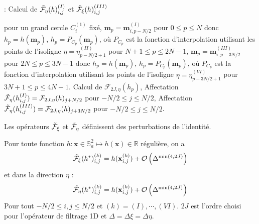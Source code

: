 \begin{center}
\begin{minipage}[H]{12cm}
  \begin{algorithm}[H]
    \caption{: Calcul de $\tilde{\mathcal{F}}_{\eta}(h)_{i,j}^{(I)}$ et $\tilde{\mathcal{F}}_{\xi}(h)_{i,j}^{(III)}$}\label{alg:ftreta}
    \begin{algorithmic}[1]
    \State pour un grand cercle $C_i^{(1)}$ fixé,
             \State  $\mathbf{m}_p = \mathbf{m}_{i,p-N/2}^{(I)}$ pour $0  \leq p \leq N$ donc $h_p = h(\mathbf{m}_p)$,
             \State $h_p = P_{C_p}(\mathbf{m}_p)$, où $P_{C_p}$ est la fonction d'interpolation utilisant les points de l'isoligne $\eta = \eta^{(II)}_{p-N/2+1}$ pour $N+1 \leq p \leq 2N-1$,
             \State  $\mathbf{m}_p = \mathbf{m}_{i,p-3N/2}^{(III)}$ pour $2N  \leq p \leq 3N-1$ donc $h_p = h(\mathbf{m}_p)$,
             \State $h_p = P_{C_p}(\mathbf{m}_p)$, où $P_{C_p}$ est la fonction d'interpolation utilisant les points de l'isoligne $\eta = \eta^{(VI)}_{p-3N/2+1}$ pour $3N+1 \leq p \leq 4N-1$.
            \EndFor
    \State Calcul de $\mathcal{F}_{2J,\eta}(h_p)$,
    \State Affectation $\tilde{\mathcal{F}}_{\eta}(h_{i,j}^{(I)}) = \mathcal{F}_{2J,\eta}(h)_{j+N/2}$ pour $-N/2 \leq j \leq N/2$,
    \State Affectation $\tilde{\mathcal{F}}_{\eta}(h_{i,j}^{(III)}) = \mathcal{F}_{2J,\eta}(h)_{j+3N/2}$ pour $-N/2 \leq j \leq N/2$.
    \EndFor
    \end{algorithmic}
    \end{algorithm}
\end{minipage}
\end{center}
Les opérateurs $\tilde{\mathcal{F}}_{\xi}$ et $\tilde{\mathcal{F}}_{\eta}$ définissent des perturbations de l'identité.
\begin{proposition}
Pour toute fonction $h : \mathbf{x} \in \mathbb{S}_a^2 \mapsto h(\mathbf{x}) \in \mathbb{R}$ régulière, on a 
\begin{equation}
\tilde{\mathcal{F}}_{\xi}(h^*)_{i,j}^{(k)} = h(\mathbf{x}_{i,j}^{(k)}) + \mathcal{O}\left( \Delta^{\min(4,2J)} \right)
\label{eq:consistance_fxi}
\end{equation}
et dans la direction $\eta$ :
\begin{equation}
\tilde{\mathcal{F}}_{\eta}(h^*)_{i,j}^{(k)} = h(\mathbf{x}_{i,j}^{(k)}) + \mathcal{O}\left( \Delta^{\min(4,2J)} \right)
\label{eq:consistance_feta}
\end{equation}
Pour tout $-N/2 \leq i,j \leq N/2$ et $(k) = (I), \cdots , (VI)$. $2J$ est l'ordre choisi pour l'opérateur de filtrage 1D et $\Delta = \Delta \xi = \Delta \eta$.
\label{prop:consistance_ftrdir}
\end{proposition}

